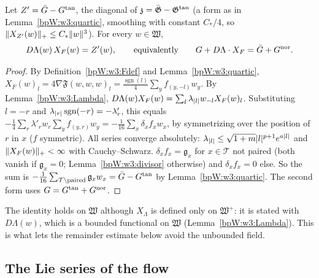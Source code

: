 \begin{proposition}\label{bpW:w3:homological}
Let $Z'=\bar G-G^{\rm tan}$, the diagonal of $\mathfrak z=\bar{\mathfrak G}-\mathfrak G^{\rm tan}$ (a form as in
Lemma~\ref{bpW:w3:quartic}, smoothing with constant $C_*/4$, so $\lVert X_{Z'}(w)\rVert_+\le C_*\lVert w\rVert^3$). For every
$w\in\mathfrak W$,
\[D\Lambda(w)\,X_F(w)=Z'(w),\qquad\text{equivalently}\qquad G+D\Lambda\cdot X_F=\bar G+G^{\rm nor}.\]
\end{proposition}

\begin{proof}
\label{stepW:w3:Xfcoord}
By Definition~\ref{bpW:w3:Fdef} and Lemma~\ref{bpW:w3:quartic},
$X_F(w)_l=4\nabla\mathfrak F(w,w,w)_l=\frac{\operatorname{sgn}(l)}{4}\sum_yf_{(y,-l)}w_y$.
\label{stepW:w3:euler}
By Lemma~\ref{bpW:w3:Lambda}, $D\Lambda(w)X_F(w)=\sum_l\lambda_{\lvert l\rvert}w_{-l}X_F(w)_l$. Substituting $l=-r$ and
$\lambda_{\lvert r\rvert}\operatorname{sgn}(-r)=-\lambda'_r$, this equals
$-\frac14\sum_r\lambda'_rw_r\sum_yf_{(y,r)}w_y=-\frac1{16}\sum_x\delta_xf_xw_x$, by symmetrizing over the position
of $r$ in $x$ ($f$ symmetric). All series converge absolutely: $\lambda_{\lvert l\rvert}\le\sqrt{1+m}\lvert l\rvert^{p+1}e^{a\lvert l\rvert}$
and $\lVert X_F(w)\rVert_+<\infty$ with Cauchy--Schwarz.
\label{stepW:w3:divide}
$\delta_xf_x=\mathfrak g_x$ for $x\in\mathcal T$ not paired (both vanish if $\mathfrak g_x=0$;
Lemma~\ref{bpW:w3:divisor} otherwise) and $\delta_xf_x=0$ else. So the sum is
$-\frac1{16}\sum_{\mathcal T\setminus\text{paired}}\mathfrak g_xw_x=\bar G-G^{\rm tan}$ by Lemma~\ref{bpW:w3:quartic}.
The second form uses $G=G^{\rm tan}+G^{\rm nor}$.
\end{proof}

\begin{remark}
The identity holds on $\mathfrak W$ although $X_\Lambda$ is defined only on $\mathfrak W^+$: it is stated with
$D\Lambda(w)$, which is a bounded functional on $\mathfrak W$ (Lemma~\ref{bpW:w3:Lambda}). This is what lets the
remainder estimate below avoid the unbounded field.
\end{remark}

\subsection{The Lie series of the flow}\label{bpW:w3:flow-sec}

